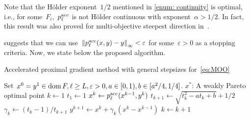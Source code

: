 \documentclass[../main]{subfiles}
\begin{document}
     Note that the H\"{o}lder exponent~$1 / 2$ mentioned in \cref{enum: continuity} is optimal, i.e., for some~$F_i$,~$p^\acc_\ell$ is not H\"{o}lder continuous with exponent~$\alpha > 1 / 2$.
     In fact, this result was also proved for multi-objective steepest direction in~\cite{Svaiter2018}.

      suggests that we can use~$\norm*{p^\acc_\ell(x, y) - y}_\infty < \varepsilon$ for some~$\varepsilon > 0$ as a stopping criteria.
Now, we state below the proposed algorithm.

\begin{algorithm}[hbtp]
    \caption{Accelerated proximal gradient method with general stepsizes for~\cref{eq:MOO}}
    \label{alg:acc_pgm_MO}
    \begin{algorithmic}[1]
        \Require Set~$x^0 = y^1 \in \dom F, \ell \ge L, \varepsilon > 0, a \in [0, 1), b \in [a^2 / 4, 1 / 4]$.
        \Ensure $x^\ast$: A weakly Pareto optimal point
        \State $k \gets 1$
        \State $t_1 \gets 1$ \label{line:t ini}
        \State $x^k \gets p^\acc_\ell(x^{k - 1}, y^k)$
        \State $t_{k + 1} \gets \sqrt{t_k^2 - a t_k + b} + 1/2$ \label{line:t rr}
        \State $\gamma_k \gets (t_k - 1) / t_{k + 1}$ \label{line:gamma}
        \State $y^{k + 1} \gets x^k + \gamma_k (x^k - x^{k - 1})$ \label{line:y}
        \State $k \gets k + 1$
        \EndWhile
    \end{algorithmic}
\end{algorithm}
\end{document}
